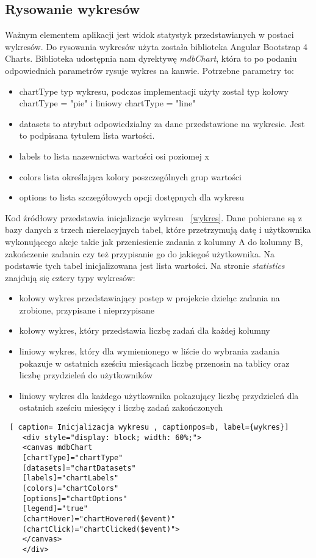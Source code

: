 \subsection{Rysowanie wykresów}
Ważnym elementem aplikacji jest widok statystyk przedstawianych w postaci wykresów. Do rysowania wykresów użyta została biblioteka Angular Bootstrap 4 Charts. Biblioteka udostępnia nam dyrektywę \textit{mdbChart},
która to po podaniu odpowiednich parametrów rysuje wykres na kanwie. \cite{MdbAngularBootstrap} Potrzebne parametry to:
\begin{itemize}
	\item chartType typ wykresu, podczas implementacji użyty został typ kołowy chartType = "pie" i liniowy chartType = "line"
	\item datasets to atrybut odpowiedzialny za dane przedstawione na wykresie. Jest to podpisana tytułem lista wartości.
	\item labels to lista nazewnictwa wartości osi poziomej x
	\item colors lista określająca kolory poszczególnych grup wartości
	\item options to lista szczegółowych opcji dostępnych dla wykresu
\end{itemize}
Kod źródłowy przedstawia inicjalizacje wykresu ~\ref{wykres}. Dane pobierane są z bazy danych z trzech nierelacyjnych tabel, które przetrzymują datę i użytkownika wykonującego akcje takie jak przeniesienie zadania z kolumny A do kolumny B, zakończenie zadania czy też przypisanie go do jakiegoś użytkownika. Na podstawie tych tabel inicjalizowana jest lista wartości. Na stronie \textit{statistics} znajdują się cztery typy wykresów:
\begin{itemize}
	\item kołowy wykres przedstawiający postęp w projekcie dzieląc zadania na zrobione, przypisane i nieprzypisane
	\item kołowy wykres, który przedstawia liczbę zadań dla każdej kolumny
	\item liniowy wykres, który dla wymienionego w liście do wybrania zadania pokazuje w ostatnich sześciu miesiącach liczbę przenosin na tablicy oraz liczbę przydzieleń do użytkowników
	\item liniowy wykres dla każdego użytkownika pokazujący liczbę przydzieleń dla ostatnich sześciu miesięcy i liczbę zadań zakończonych
\end{itemize}


\begin{lstlisting} [ caption= Inicjalizacja wykresu , captionpos=b, label={wykres}]
	<div style="display: block; width: 60%;">
	<canvas mdbChart
	[chartType]="chartType"
	[datasets]="chartDatasets"
	[labels]="chartLabels"
	[colors]="chartColors"
	[options]="chartOptions"
	[legend]="true"
	(chartHover)="chartHovered($event)"
	(chartClick)="chartClicked($event)">
	</canvas>
	</div>
\end{lstlisting}
